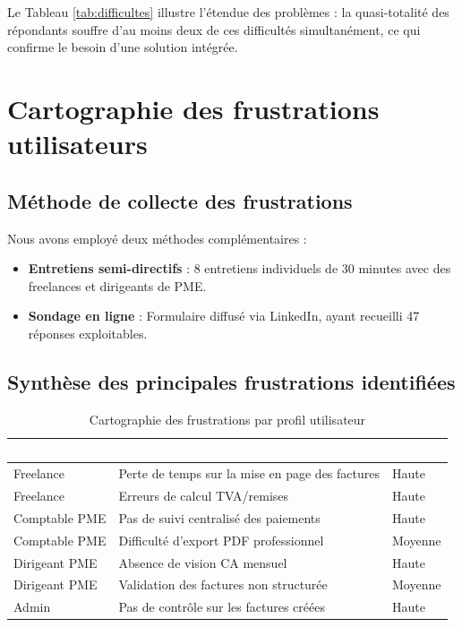 Le Tableau \ref{tab:difficultes} illustre l'étendue des problèmes : la quasi-totalité des répondants souffre d'au moins deux de ces difficultés simultanément, ce qui confirme le besoin d'une solution intégrée.

\section{Cartographie des frustrations utilisateurs}

\subsection{Méthode de collecte des frustrations}

Nous avons employé deux méthodes complémentaires :
\begin{itemize}
    \item \textbf{Entretiens semi-directifs} : 8 entretiens individuels de 30 minutes avec des freelances et dirigeants de PME.
    \item \textbf{Sondage en ligne} : Formulaire diffusé via LinkedIn, ayant recueilli 47 réponses exploitables.
\end{itemize}

\subsection{Synthèse des principales frustrations identifiées}

\begin{table}[H]
\centering
\caption{Cartographie des frustrations par profil utilisateur}
\label{tab:frustrations}
\begin{tabularx}{\textwidth}{|l|X|l|}
\hline
\rowcolor{emsiblue}\textcolor{white}{\textbf{Profil}} & \textcolor{white}{\textbf{Frustration principale}} & \textcolor{white}{\textbf{Priorité}} \\
\hline
Freelance & Perte de temps sur la mise en page des factures & Haute \\
Freelance & Erreurs de calcul TVA/remises & Haute \\
Comptable PME & Pas de suivi centralisé des paiements & Haute \\
Comptable PME & Difficulté d'export PDF professionnel & Moyenne \\
Dirigeant PME & Absence de vision CA mensuel & Haute \\
Dirigeant PME & Validation des factures non structurée & Moyenne \\
Admin & Pas de contrôle sur les factures créées & Haute \\
\hline
\end{tabularx}
\end{table}

